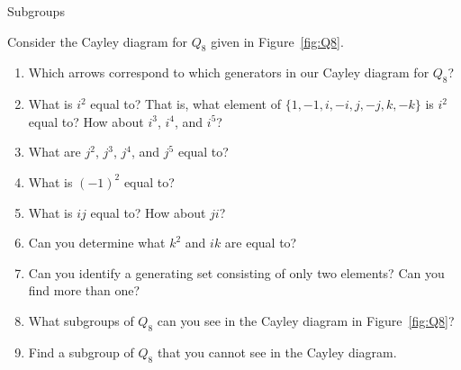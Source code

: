 \begin{section}{Subgroups}
\begin{exercise}
Consider the Cayley diagram for $Q_8$ given in Figure~\ref{fig:Q8}.
\begin{enumerate}[label=\rm{(\alph*)}]
\item Which arrows correspond to which generators in our Cayley diagram for $Q_8$?
\item What is $i^2$ equal to?  That is, what element of $\{1,-1,i,-i,j,-j,k,-k\}$ is $i^2$ equal to?  How about $i^3$, $i^4$, and $i^5$?
\item What are $j^2$, $j^3$, $j^4$, and $j^5$ equal to?
\item What is $(-1)^2$ equal to?
\item What is $ij$ equal to?  How about $ji$?
\item Can you determine what $k^2$ and $ik$ are equal to?
\item Can you identify a generating set consisting of only two elements?  Can you find more than one?
\item What subgroups of $Q_8$ can you see in the Cayley diagram in Figure~\ref{fig:Q8}?
\item Find a subgroup of $Q_8$ that you cannot see in the Cayley diagram.
\end{enumerate}
\end{exercise}

\end{section}

